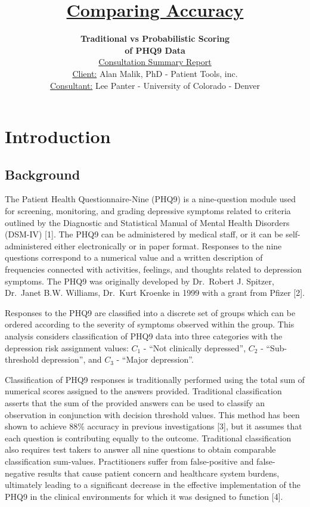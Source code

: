 \documentclass[12pt,]{article}
\title{\vspace{1.5in} \textbf{\underline{Comparing Accuracy}}}
\subtitle{\vspace{0.35in} \textbf{Traditional vs Probabilistic Scoring}\\
\textbf{of PHQ9 Data}\\
\vspace{0.5in} \underline{Consultation Summary Report }\\
\vspace{0.5in} \underline{Client:} \hspace{10pt} Alan Malik, PhD -
Patient Tools, inc.\\
\vspace{0.25in} \underline{Consultant:} \hspace{10pt} Lee Panter -
University of Colorado - Denver}
\author{}
\date{}
\begin{document}
\maketitle

\thispagestyle{empty}

\newpage

\thispagestyle{empty}

\setcounter{secnumdepth}{4}
\setcounter{tocdepth}{4}
\begin{singlespace}
\tableofcontents
\end{singlespace}

\newpage


\hypertarget{introduction}{%
\section{Introduction}\label{introduction}}

\hypertarget{background}{%
\subsection{Background}\label{background}}

The Patient Health Questionnaire-Nine (PHQ9) is a nine-question module
used for screening, monitoring, and grading depressive symptoms related
to criteria outlined by the Diagnostic and Statistical Manual of Mental
Health Disorders (DSM-IV) {[}1{]}. The PHQ9 can be administered by
medical staff, or it can be self-administered either electronically or
in paper format. Responses to the nine questions correspond to a
numerical value and a written description of frequencies connected with
activities, feelings, and thoughts related to depression symptoms. The
PHQ9 was originally developed by Dr.~Robert J. Spitzer, Dr.~Janet B.W.
Williams, Dr.~Kurt Kroenke in 1999 with a grant from Pfizer {[}2{]}.

Responses to the PHQ9 are classified into a discrete set of groups which
can be ordered according to the severity of symptoms observed within the
group. This analysis considers classification of PHQ9 data into three
categories with the depression risk assignment values: \(C_{1}\) - ``Not
clinically depressed'', \(C_{2}\) - ``Sub-threshold depression'', and
\(C_{3}\) - ``Major depression''.

Classification of PHQ9 responses is traditionally performed using the
total sum of numerical scores assigned to the answers provided.
Traditional classification asserts that the sum of the provided answers
can be used to classify an observation in conjunction with decision
threshold values. This method has been shown to achieve 88\% accuracy in
previous investigations {[}3{]}, but it assumes that each question is
contributing equally to the outcome. Traditional classification also
requires test takers to answer all nine questions to obtain comparable
classification sum-values. Practitioners suffer from false-positive and
false-negative results that cause patient concern and healthcare system
burdens, ultimately leading to a significant decrease in the effective
implementation of the PHQ9 in the clinical environments for which it was
designed to function {[}4{]}.
\end{document}
